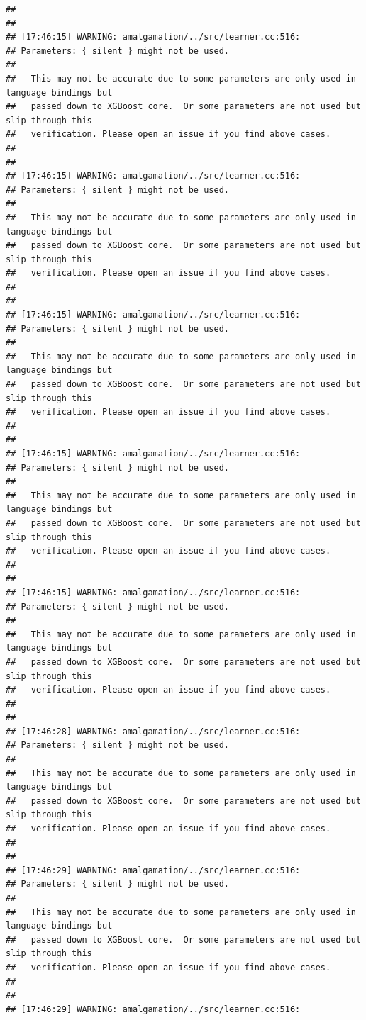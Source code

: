 \documentclass[AMS,STIX2COL]{WileyNJD-v2}\usepackage[]{graphicx}\usepackage[]{color}
\makeatletter
\newenvironment{kframe}{%
 \def\at@end@of@kframe{}%
 \ifinner\ifhmode%
  \def\at@end@of@kframe{\end{minipage}}%
  \begin{minipage}{\columnwidth}%
 \fi\fi%
 \def\FrameCommand##1{\hskip\@totalleftmargin \hskip-\fboxsep
 \colorbox{shadecolor}{##1}\hskip-\fboxsep
     \hskip-\linewidth \hskip-\@totalleftmargin \hskip\columnwidth}%
 \MakeFramed {\advance\hsize-\width
   \@totalleftmargin\z@ \linewidth\hsize
   \@setminipage}}%
 {\par\unskip\endMakeFramed%
 \at@end@of@kframe}
\newenvironment{knitrout}{}{} %
\makeatother
\begin{document}
\begin{knitrout}
\begin{kframe}
\begin{verbatim}
## 
## 
## [17:46:15] WARNING: amalgamation/../src/learner.cc:516: 
## Parameters: { silent } might not be used.
## 
##   This may not be accurate due to some parameters are only used in language bindings but
##   passed down to XGBoost core.  Or some parameters are not used but slip through this
##   verification. Please open an issue if you find above cases.
## 
## 
## [17:46:15] WARNING: amalgamation/../src/learner.cc:516: 
## Parameters: { silent } might not be used.
## 
##   This may not be accurate due to some parameters are only used in language bindings but
##   passed down to XGBoost core.  Or some parameters are not used but slip through this
##   verification. Please open an issue if you find above cases.
## 
## 
## [17:46:15] WARNING: amalgamation/../src/learner.cc:516: 
## Parameters: { silent } might not be used.
## 
##   This may not be accurate due to some parameters are only used in language bindings but
##   passed down to XGBoost core.  Or some parameters are not used but slip through this
##   verification. Please open an issue if you find above cases.
## 
## 
## [17:46:15] WARNING: amalgamation/../src/learner.cc:516: 
## Parameters: { silent } might not be used.
## 
##   This may not be accurate due to some parameters are only used in language bindings but
##   passed down to XGBoost core.  Or some parameters are not used but slip through this
##   verification. Please open an issue if you find above cases.
## 
## 
## [17:46:15] WARNING: amalgamation/../src/learner.cc:516: 
## Parameters: { silent } might not be used.
## 
##   This may not be accurate due to some parameters are only used in language bindings but
##   passed down to XGBoost core.  Or some parameters are not used but slip through this
##   verification. Please open an issue if you find above cases.
## 
## 
## [17:46:28] WARNING: amalgamation/../src/learner.cc:516: 
## Parameters: { silent } might not be used.
## 
##   This may not be accurate due to some parameters are only used in language bindings but
##   passed down to XGBoost core.  Or some parameters are not used but slip through this
##   verification. Please open an issue if you find above cases.
## 
## 
## [17:46:29] WARNING: amalgamation/../src/learner.cc:516: 
## Parameters: { silent } might not be used.
## 
##   This may not be accurate due to some parameters are only used in language bindings but
##   passed down to XGBoost core.  Or some parameters are not used but slip through this
##   verification. Please open an issue if you find above cases.
## 
## 
## [17:46:29] WARNING: amalgamation/../src/learner.cc:516: 

\end{verbatim}
\end{kframe}
\end{knitrout}
\end{document}
